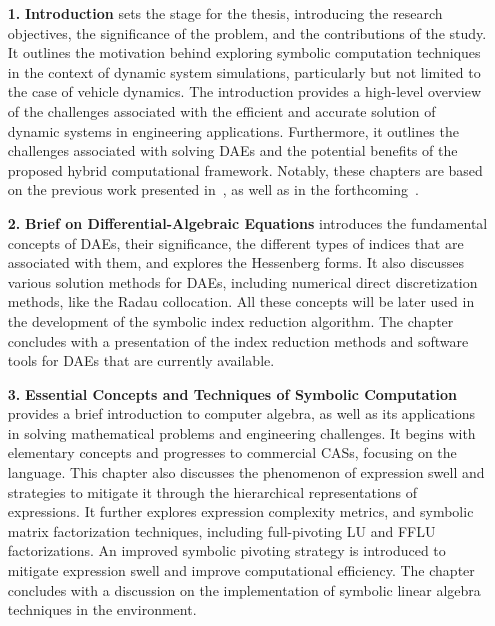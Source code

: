 \begin{enumerate}
  \setlength\itemsep{0.0em}
  \item[\textbf{1.}] \textbf{Introduction} sets the stage for the thesis, introducing the research objectives, the significance of the problem, and the contributions of the study. It outlines the motivation behind exploring symbolic computation techniques in the context of dynamic system simulations, particularly but not limited to the case of vehicle dynamics. The introduction provides a high-level overview of the challenges associated with the efficient and accurate solution of dynamic systems in engineering applications. Furthermore, it outlines the challenges associated with solving \acp{DAE} and the potential benefits of the proposed hybrid computational framework. Notably, these chapters are based on the previous work presented in~\cite{stocco2024symbolic, stocco2024matrix}, as well as in the forthcoming~\cite{stocco2024imece_solution, larcher2024imece_symbolic}.
  \item[\textbf{2.}] \textbf{Brief on Differential-Algebraic Equations} introduces the fundamental concepts of \acp{DAE}, their significance, the different types of indices that are associated with them, and explores the Hessenberg forms. It also discusses various solution methods for \acp{DAE}, including numerical direct discretization methods, like the Radau collocation. All these concepts will be later used in the development of the symbolic index reduction algorithm. The chapter concludes with a presentation of the index reduction methods and software tools for \acp{DAE} that are currently available.
  \item[\textbf{3.}] \textbf{Essential Concepts and Techniques of Symbolic Computation} provides a brief introduction to computer algebra, as well as its applications in solving mathematical problems and engineering challenges. It begins with elementary concepts and progresses to commercial \acp{CAS}, focusing on the \Maple{} language. This chapter also discusses the phenomenon of expression swell and strategies to mitigate it through the hierarchical representations of expressions. It further explores expression complexity metrics, and symbolic matrix factorization techniques, including full-pivoting \ac{LU} and \ac{FFLU} factorizations. An improved symbolic pivoting strategy is introduced to mitigate expression swell and improve computational efficiency. The chapter concludes with a discussion on the implementation of symbolic linear algebra techniques in the \Maple{} environment.

\end{enumerate}
